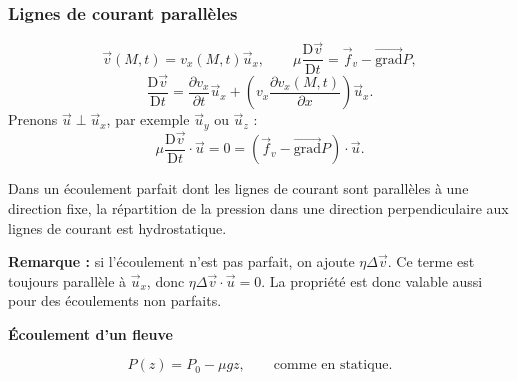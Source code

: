 \documentclass[11pt,a4paper]{article}
\newcommand{\grad}{\overrightarrow{\mathrm{grad}}}
\newcommand{\pd}[2]{\frac{\partial #1}{\partial #2}}
\newcommand{\ux}{\vec u_x}\newcommand{\uy}{\vec u_y}\newcommand{\uz}{\vec u_z}
\newcommand{\cste}{\mathrm{cste}}
\newcommand{\etoiles}[1]{\foreach \i in {1,...,#1}{\mathord{\star}\,}}
\newcommand{\Dv}{\frac{\mathrm D\vec v}{\mathrm Dt}}
\newcommand{\fv}{\vec f_v}\newcommand{\fvt}{\vec f_{v,\mathrm{tot}}}\newcommand{\fvi}{\vec f_{v,\mathrm{inertie}}}
\begin{document}
\subsubsection{Lignes de courant parallèles}
\begin{center}\end{center}
\[\vec v(M,t)=v_x(M,t)\ux,\qquad\mu\Dv=\fv-\grad P,\]
\[\Dv=\pd{v_x}t\ux+\left(v_x\pd{v_x(M,t)}x\right)\ux.\]
Prenons $\vec u\perp\ux$, par exemple $\uy$ ou $\uz$ :
\[\mu\Dv\cdot\vec u=0=(\fv-\grad P)\cdot\vec u.\]
\begin{cadre}[etoiles={\etoiles{5}}]
Dans un écoulement parfait dont les lignes de courant sont parallèles à une direction fixe, la répartition de la pression dans une direction perpendiculaire aux lignes de courant est hydrostatique.
\end{cadre}
\textbf{Remarque :} si l'écoulement n'est pas parfait, on ajoute $\eta\Delta\vec v$. Ce terme est toujours parallèle à $\ux$, donc $\eta\Delta\vec v\cdot\vec u=0$. La propriété est donc valable aussi pour des écoulements non parfaits.
\begin{exemple}[breakable,etoiles={\etoiles{5}}]
\textbf{Écoulement d'un fleuve}
\begin{center}\end{center}
\[P(z)=P_0-\mu gz,\qquad\text{comme en statique.}\]
\end{exemple}
\end{document}
